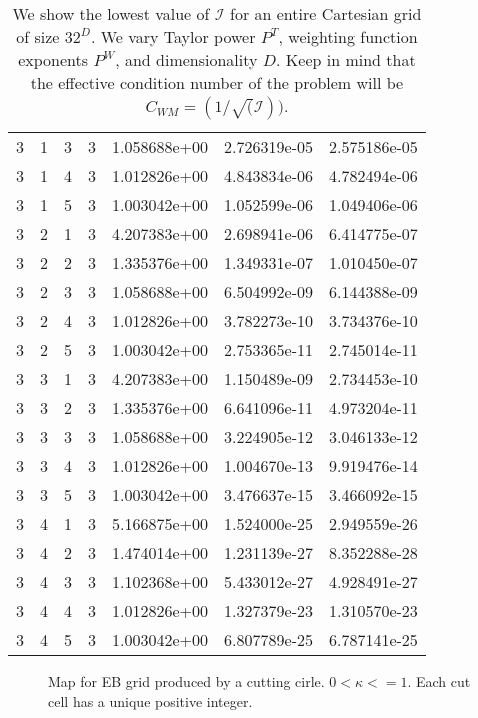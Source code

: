 \documentclass{article}
\newcommand{\cali}{\mathcal{I}}
\begin{document}
\begin{small}
\begin{table}
\begin{center}
\begin{tabular}{|cccc|ccc|}
3 & 1 & 3 & 3 & 1.058688e+00 & 2.726319e-05 & 2.575186e-05 \\ 
3 & 1 & 4 & 3 & 1.012826e+00 & 4.843834e-06 & 4.782494e-06 \\ 
3 & 1 & 5 & 3 & 1.003042e+00 & 1.052599e-06 & 1.049406e-06 \\ 
\hline
3 & 2 & 1 & 3 & 4.207383e+00 & 2.698941e-06 & 6.414775e-07 \\ 
3 & 2 & 2 & 3 & 1.335376e+00 & 1.349331e-07 & 1.010450e-07 \\ 
3 & 2 & 3 & 3 & 1.058688e+00 & 6.504992e-09 & 6.144388e-09 \\ 
3 & 2 & 4 & 3 & 1.012826e+00 & 3.782273e-10 & 3.734376e-10 \\ 
3 & 2 & 5 & 3 & 1.003042e+00 & 2.753365e-11 & 2.745014e-11 \\ 
\hline
3 & 3 & 1 & 3 & 4.207383e+00 & 1.150489e-09 & 2.734453e-10 \\ 
3 & 3 & 2 & 3 & 1.335376e+00 & 6.641096e-11 & 4.973204e-11 \\ 
3 & 3 & 3 & 3 & 1.058688e+00 & 3.224905e-12 & 3.046133e-12 \\ 
3 & 3 & 4 & 3 & 1.012826e+00 & 1.004670e-13 & 9.919476e-14 \\ 
3 & 3 & 5 & 3 & 1.003042e+00 & 3.476637e-15 & 3.466092e-15 \\ 
\hline
3 & 4 & 1 & 3 & 5.166875e+00 & 1.524000e-25 & 2.949559e-26 \\ 
3 & 4 & 2 & 3 & 1.474014e+00 & 1.231139e-27 & 8.352288e-28 \\ 
3 & 4 & 3 & 3 & 1.102368e+00 & 5.433012e-27 & 4.928491e-27 \\ 
3 & 4 & 4 & 3 & 1.012826e+00 & 1.327379e-23 & 1.310570e-23 \\ 
3 & 4 & 5 & 3 & 1.003042e+00 & 6.807789e-25 & 6.787141e-25 \\
\hline
\end{tabular}
\end{center}
\label{tab::worst_all_reg_inv_conv}
\caption
    {
      We show the lowest value of
      $\cali$ for an entire Cartesian grid of size $32^D$.
      We vary Taylor power $P^T$, weighting
      function exponents $P^W$, and dimensionality $D$.   Keep in mind
      that the effective condition number of the problem will be 
      $C_{WM} = (1/\sqrt(\cali))$.
    }
\end{table}
\end{small}

\begin{figure}
\centerline{} 
\caption
    {
      Map for EB grid produced by a cutting cirle. $0 <  \kappa <= 1$.
  Each cut cell has a unique positive integer.}
\label{fig::unmerged2dmap}
\end{figure}
\end{document}
